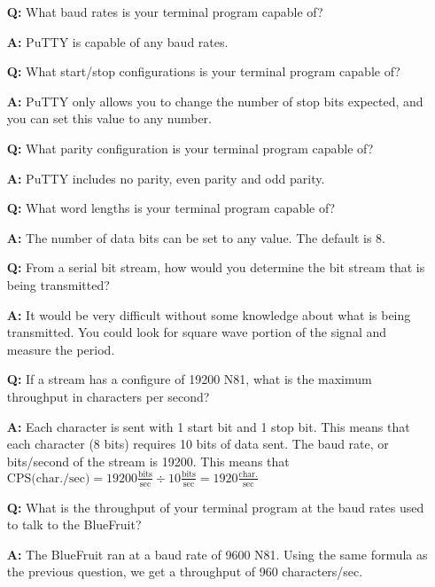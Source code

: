 \documentclass{article}
\begin{document}
\begin{itemize}

\item[\textbf{Q:}] What baud rates is your terminal program capable of?
\item[\textbf{A:}] PuTTY is capable of any baud rates.
\pagebreak

\item[\textbf{Q:}] What start/stop configurations is your terminal program capable of?
\item[\textbf{A:}] PuTTY only allows you to change the number of stop bits expected, and you can set this value to any number.

\item[\textbf{Q:}] What parity configuration is your terminal program capable of?
\item[\textbf{A:}] PuTTY includes no parity, even parity and odd parity.

\item[\textbf{Q:}] What word lengths is your terminal program capable of?
\item[\textbf{A:}] The number of data bits can be set to any value. The default is 8.

\item[\textbf{Q:}] From a serial bit stream, how would you determine the bit stream that is being transmitted?
\item[\textbf{A:}] It would be very difficult without some knowledge about what is being transmitted. You could look for square wave portion of the signal and measure the period.

\item[\textbf{Q:}] If a stream has a configure of 19200 N81, what is the maximum throughput in characters per second?
\item[\textbf{A:}] Each character is sent with 1 start bit and 1 stop bit. This means that each character (8 bits) requires 10 bits of data sent. The baud rate, or bits/second of the stream is 19200. This means that $\text{CPS(char./sec)} = 19200 \frac{\text{bits}}{\text{sec}} \div 10 \frac{\text{bits}}{\text{sec}} = 1920 \frac{\text{char.}}{\text{sec}}$

\item[\textbf{Q:}] What is the throughput of your terminal program at the baud rates used to talk to the BlueFruit?
\item[\textbf{A:}] The BlueFruit ran at a baud rate of 9600 N81. Using the same formula as the previous question, we get a throughput of 960 characters/sec.
\end{itemize}
\end{document}
